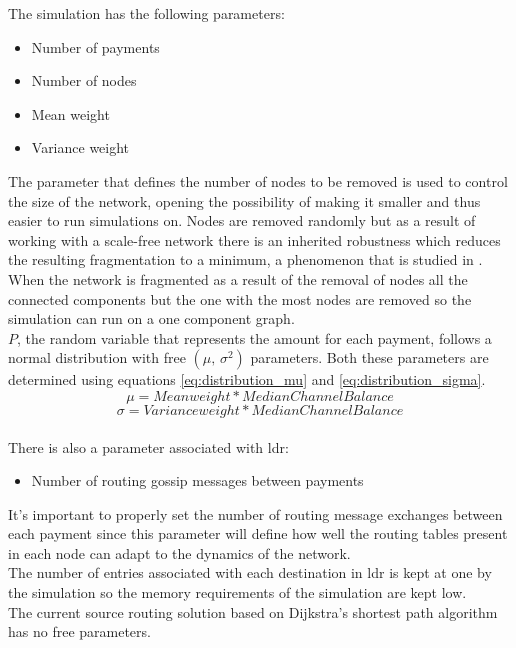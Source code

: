 The simulation has the following parameters:
\begin{itemize}
    \item Number of payments
    \item Number of nodes
    \item Mean weight
    \item Variance weight
\end{itemize}
The parameter that defines the number of nodes to be removed is used to control the size of the network, opening the possibility of making it smaller and thus easier to run simulations on. Nodes are removed randomly but as a result of working with a scale-free network there is an inherited robustness \cite{network_science} which reduces the resulting fragmentation to a minimum, a phenomenon that is studied in \cite{ln_topological}. When the network is fragmented as a result of the removal of nodes all the connected components but the one with the most nodes are removed so the simulation can run on a one component graph.\\
$P$, the random variable that represents the amount for each payment, follows a normal distribution with free $(\mu,\,\sigma^{2})$ parameters. Both these parameters are determined using equations \ref{eq:distribution_mu} and \ref{eq:distribution_sigma}. 
\begin{equation}
    \mu = Mean weight * Median Channel Balance
    \label{eq:distribution_mu}
\end{equation}
\begin{equation}
    \sigma = Variance weight * Median Channel Balance
    \label{eq:distribution_sigma}
\end{equation}
\\
There is also a parameter associated with \acrshort{ldr}:
\begin{itemize}
    \item Number of routing gossip messages between payments
\end{itemize}
It's important to properly set the number of routing message exchanges between each payment since this parameter will define how well the routing tables present in each node can adapt to the dynamics of the network.\\
The number of entries associated with each destination in \acrshort{ldr} is kept at one by the simulation so the memory requirements of the simulation are kept low.\\
The current source routing solution based on Dijkstra's shortest path algorithm has no free parameters.\\

